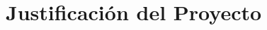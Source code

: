 \documentclass[spanish,titlepage,table]{practicas}
\begin{document}

\section{Justificación del Proyecto}
\end{document}
